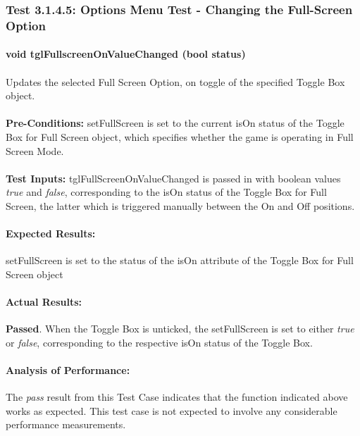 \documentclass{article}
\begin{document}
    \subsubsection{Test 3.1.4.5: Options Menu Test - Changing the Full-Screen Option}
    \paragraph{}\textbf{void tglFullscreenOnValueChanged (bool status)}
    \paragraph{} Updates the selected Full Screen Option, on toggle of the specified Toggle Box object.
    \paragraph{}\textbf{Pre-Conditions:} setFullScreen is set to the current isOn status of the Toggle Box for Full Screen object, which specifies whether the game is operating in Full Screen Mode.
    \paragraph{}\textbf{Test Inputs:} tglFullScreenOnValueChanged is passed in with boolean values \emph{true} and \emph{false}, corresponding to the isOn status of the Toggle Box for Full Screen, the latter which is triggered manually between the On and Off positions.
    \paragraph{Expected Results:} setFullScreen is set to the status  of the isOn attribute of the Toggle Box for Full Screen object
    \paragraph{Actual Results:} \textbf{Passed}. When the Toggle Box is unticked, the setFullScreen is set to either \emph{true} or \emph{false}, corresponding to the respective isOn status of the Toggle Box.
    \paragraph{Analysis of Performance:} The \emph{pass} result from this Test Case indicates that the function indicated above works as expected. This test case is not expected to involve any considerable performance measurements.
    
\end{document}

